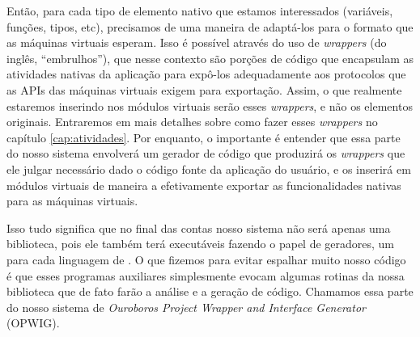     Então, para cada tipo de elemento nativo que estamos interessados
    (variáveis, funções, tipos, etc), precisamos de uma maneira de adaptá-los
    para o formato que as máquinas virtuais esperam. Isso é possível através do
    uso de \textit{wrappers} (do inglês, ``embrulhos''), que nesse contexto são
    porções de código que encapsulam as atividades nativas da aplicação para
    expô-los adequadamente aos protocolos que as APIs das máquinas virtuais
    exigem para exportação. Assim, o que realmente estaremos inserindo nos
    módulos virtuais serão esses \textit{wrappers}, e não os elementos
    originais. Entraremos em mais detalhes sobre como fazer esses \textit{wrappers} no
    capítulo \ref{cap:atividades}. Por enquanto, o importante é entender que
    essa parte do nosso sistema envolverá um gerador de código que produzirá
    os \textit{wrappers} que ele julgar necessário dado o código fonte da
    aplicação do usuário, e os inserirá em módulos virtuais de maneira a
    efetivamente exportar as funcionalidades nativas para as máquinas virtuais.

    Isso tudo significa que no final das contas nosso sistema não será apenas
    uma biblioteca, pois ele também terá executáveis fazendo o papel de
    geradores, um para cada linguagem de \script{}. O que fizemos para evitar
    espalhar muito nosso código é que esses programas auxiliares simplesmente
    evocam algumas rotinas da nossa biblioteca que de fato farão a análise e
    a geração de código. Chamamos essa parte do nosso sistema de \emph{Ouroboros
    Project Wrapper and Interface Generator} (OPWIG).
